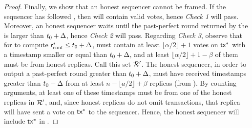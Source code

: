 \begin{proof}
    \noindent
    Finally, we show that an honest sequencer cannot be framed.
    If the sequencer has followed , then \bidcert will contain valid votes, hence \emph{Check 1} will pass.
    Moreover, an honest sequencer waits until the past-perfect round returned by the \podtm is larger than $t_0 + \Delta$, hence \emph{Check 2} will pass.
    Regarding \emph{Check 3}, observe that
    for \identifySequencer{} to compute $\textsf{r}_\text{conf}^* \leq t_0+\Delta$, \txcert must contain at least $\lfloor \alpha/2 \rfloor + 1$ votes on $\textsf{tx}^*$ with a timestamp smaller or equal than $t_0+\Delta$, and at least $\lfloor \alpha/2 \rfloor + 1 - \beta$ of them must be from honest replicas. Call this set $\mathcal{R}'$.
    The honest sequencer, in order to output a past-perfect round greater than $t_0+\Delta$, must have received timestamps greater than $t_0+\Delta$ from at least $n - \lfloor a/2 \rfloor + \beta$ replicas (from ).
    By counting arguments, at least one of these timestamps must be from one of the honest replicas in $\mathcal{R}'$, and, since honest replicas do not omit transactions, that replica will have sent a vote on $\textsf{tx}^*$ to the sequencer. Hence, the honest sequencer will include $\textsf{tx}^*$ in \bag.
\end{proof}


